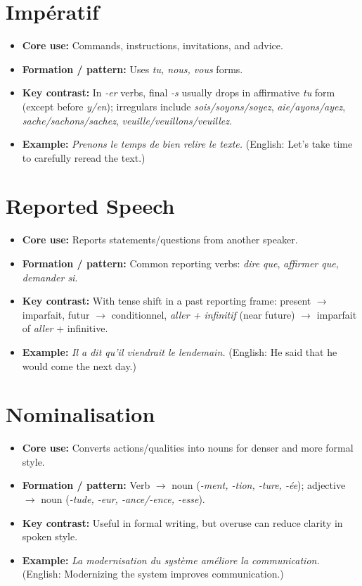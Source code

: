 \documentclass{article}
\begin{document}
\section{Impératif}
\begin{itemize}
    \item \textbf{Core use:} Commands, instructions, invitations, and advice.
    \item \textbf{Formation / pattern:} Uses \textit{tu, nous, vous} forms.
    \item \textbf{Key contrast:} In \textit{-er} verbs, final \textit{-s} usually drops in affirmative \textit{tu} form (except before \textit{y/en}); irregulars include \textit{sois/soyons/soyez}, \textit{aie/ayons/ayez}, \textit{sache/sachons/sachez}, \textit{veuille/veuillons/veuillez}.
    \item \textbf{Example:} \textit{Prenons le temps de bien relire le texte.} (English: Let's take time to carefully reread the text.)
\end{itemize}

\section{Reported Speech}
\begin{itemize}
    \item \textbf{Core use:} Reports statements/questions from another speaker.
    \item \textbf{Formation / pattern:} Common reporting verbs: \textit{dire que}, \textit{affirmer que}, \textit{demander si}.
    \item \textbf{Key contrast:} With tense shift in a past reporting frame: present $\to$ imparfait, futur $\to$ conditionnel, \textit{aller + infinitif} (near future) $\to$ imparfait of \textit{aller} + infinitive.
    \item \textbf{Example:} \textit{Il a dit qu'il viendrait le lendemain.} (English: He said that he would come the next day.)
\end{itemize}

\section{Nominalisation}
\begin{itemize}
    \item \textbf{Core use:} Converts actions/qualities into nouns for denser and more formal style.
    \item \textbf{Formation / pattern:} Verb $\to$ noun (\textit{-ment, -tion, -ture, -ée}); adjective $\to$ noun (\textit{-tude, -eur, -ance/-ence, -esse}).
    \item \textbf{Key contrast:} Useful in formal writing, but overuse can reduce clarity in spoken style.
    \item \textbf{Example:} \textit{La modernisation du système améliore la communication.} (English: Modernizing the system improves communication.)
\end{itemize}
\end{document}
